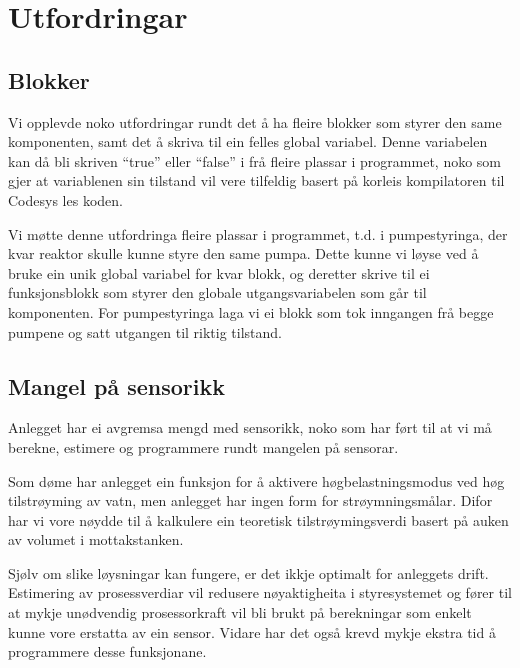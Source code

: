 \section{Utfordringar}
\thispagestyle{fancy}

\subsection{Blokker}
Vi opplevde noko utfordringar rundt det å ha fleire blokker som styrer den same komponenten, samt det å  
skriva til ein felles global variabel.
Denne variabelen kan då bli skriven ``true'' eller ``false'' i frå fleire plassar i programmet, noko som gjer at 
variablenen sin tilstand vil vere tilfeldig basert på korleis kompilatoren til \gls{Codesys} les koden.

Vi møtte denne utfordringa fleire plassar i programmet, t.d. i pumpestyringa,
der kvar reaktor skulle kunne styre den same pumpa.
Dette kunne vi løyse ved å bruke ein unik global variabel for kvar blokk, 
og deretter skrive til ei funksjonsblokk som styrer den globale utgangsvariabelen som går til komponenten.\newline
For pumpestyringa laga vi ei blokk som tok inngangen frå begge pumpene og satt utgangen til riktig tilstand.  

\subsection{Mangel på sensorikk}

Anlegget har ei avgremsa mengd med sensorikk, 
noko som har ført til at vi må berekne, estimere og programmere rundt mangelen på sensorar.

Som døme har anlegget ein funksjon for å aktivere
høgbelastningsmodus ved høg tilstrøyming av vatn, 
men anlegget har ingen form for strøymningsmålar.\newline
Difor har vi vore nøydde til å kalkulere ein teoretisk tilstrøymingsverdi basert på auken av volumet i mottakstanken.

Sjølv om slike løysningar kan fungere, er det ikkje optimalt for anleggets drift.
Estimering av prosessverdiar vil redusere nøyaktigheita i styresystemet og fører til at
mykje unødvendig prosessorkraft vil bli brukt på berekningar som enkelt kunne vore erstatta av ein sensor.\newline
Vidare har det også krevd mykje ekstra tid å programmere desse funksjonane.





